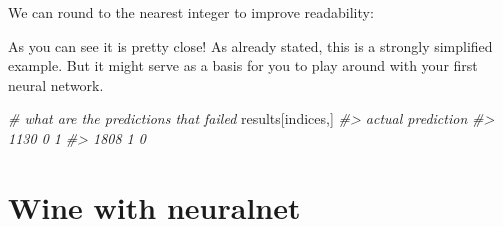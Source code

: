 \documentclass[]{book}
\newenvironment{Shaded}{\begin{snugshade}}{\end{snugshade}}
\newcommand{\CommentTok}[1]{\textcolor[rgb]{0.56,0.35,0.01}{\textit{#1}}}
\newcommand{\DecValTok}[1]{\textcolor[rgb]{0.00,0.00,0.81}{#1}}
\newcommand{\KeywordTok}[1]{\textcolor[rgb]{0.13,0.29,0.53}{\textbf{#1}}}
\newcommand{\NormalTok}[1]{#1}
\newcommand{\OperatorTok}[1]{\textcolor[rgb]{0.81,0.36,0.00}{\textbf{#1}}}
\newcommand{\StringTok}[1]{\textcolor[rgb]{0.31,0.60,0.02}{#1}}
\begin{document}
We can round to the nearest integer to improve readability:

\begin{Shaded}
\end{Shaded}

As you can see it is pretty close! As already stated, this is a strongly simplified example. But it might serve as a basis for you to play around with your first neural network.

\begin{Shaded}
\end{Shaded}

\begin{Shaded}
\begin{Highlighting}[]
\CommentTok{# what are the predictions that failed}
\NormalTok{results[indices,]}
\CommentTok{#>      actual prediction}
\CommentTok{#> 1130      0          1}
\CommentTok{#> 1808      1          0}
\end{Highlighting}
\end{Shaded}

\hypertarget{wine-with-neuralnet}{%
\chapter{Wine with neuralnet}\label{wine-with-neuralnet}}
\end{document}

